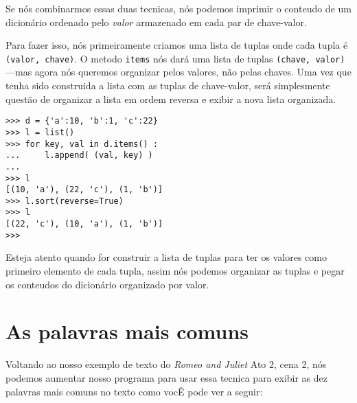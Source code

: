 Se nós combinarmos essas duas tecnicas, nós podemos imprimir o conteudo
de um dicionário ordenado pelo \emph{valor} armazenado em cada par de 
chave-valor.

Para fazer isso, nós primeiramente criamos uma lista de tuplas onde cada tupla é
{\tt (valor, chave)}. O metodo {\tt items} nós dará uma lista de tuplas 
{\tt (chave, valor)} ---mas agora nós queremos organizar pelos valores, não pelas chaves.
Uma vez que tenha sido construida a lista com as tuplas de chave-valor, será
simplesmente questão de organizar a lista em ordem reversa e exibir a nova 
lista organizada.

\beforeverb
\begin{verbatim}
>>> d = {'a':10, 'b':1, 'c':22}
>>> l = list()
>>> for key, val in d.items() :
...     l.append( (val, key) )
... 
>>> l
[(10, 'a'), (22, 'c'), (1, 'b')]
>>> l.sort(reverse=True)
>>> l
[(22, 'c'), (10, 'a'), (1, 'b')]
>>> 
\end{verbatim}
\afterverb
%
Esteja atento quando for construir a lista de tuplas para ter os valores como
primeiro elemento de cada tupla, assim nós podemos organizar as tuplas e pegar os
conteudos do dicionário organizado por valor.

\section{As palavras mais comuns}

Voltando ao nosso exemplo de texto do \emph{Romeo and Juliet}
Ato 2, cena 2, nós podemos aumentar nosso programa para usar essa tecnica
para exibir as dez palavras mais comuns no texto como vocÊ pode ver a seguir:

